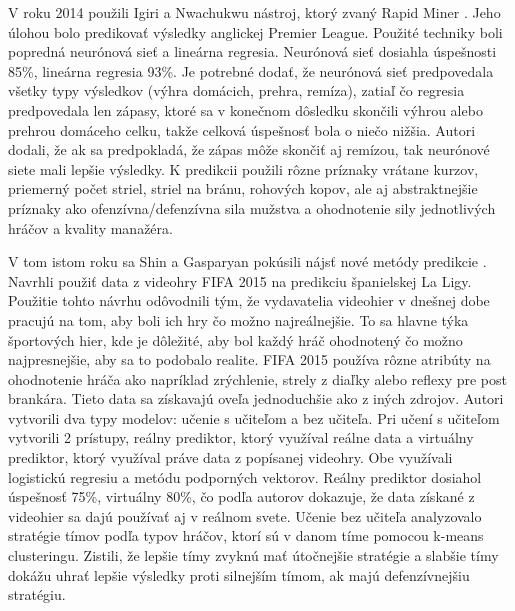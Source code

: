 V roku 2014 použili Igiri a Nwachukwu nástroj, ktorý zvaný Rapid Miner \citep{related:igiri}. 
Jeho úlohou bolo predikovať výsledky anglickej Premier League. 
Použité techniky boli popredná neurónová sieť a lineárna regresia. 
Neurónová sieť dosiahla úspešnosti 85\%, lineárna regresia 93\%. 
Je potrebné dodať, že neurónová sieť predpovedala všetky typy výsledkov (výhra domácich, prehra, remíza), zatiaľ čo regresia predpovedala len zápasy, ktoré sa v konečnom dôsledku skončili výhrou alebo prehrou domáceho celku, takže celková úspešnosť bola o niečo nižšia. 
Autori dodali, že ak sa predpokladá, že zápas môže skončiť aj remízou, tak neurónové siete mali lepšie výsledky. 
K predikcii použili rôzne príznaky vrátane kurzov, priemerný počet striel, striel na bránu, rohových kopov, ale aj abstraktnejšie príznaky ako ofenzívna/defenzívna sila mužstva a ohodnotenie sily jednotlivých hráčov a kvality manažéra.

V tom istom roku sa Shin a Gasparyan pokúsili nájsť nové metódy predikcie \citep{related:shin}. 
Navrhli použiť data z videohry FIFA 2015 na predikciu španielskej La Ligy.
Použitie tohto návrhu odôvodnili tým, že vydavatelia videohier v dnešnej dobe pracujú na tom, aby boli ich hry čo možno najreálnejšie.
To sa hlavne týka športových hier, kde je dôležité, aby bol každý hráč ohodnotený čo možno najpresnejšie, aby sa to podobalo realite.
FIFA 2015 používa rôzne atribúty na ohodnotenie hráča ako napríklad zrýchlenie, strely z diaľky alebo reflexy pre post brankára.
Tieto data sa získavajú oveľa jednoduchšie ako z iných zdrojov.
Autori vytvorili dva typy modelov: učenie s učiteľom a bez učiteľa.
Pri učení s učiteľom vytvorili 2 prístupy, reálny prediktor, ktorý využíval reálne data a virtuálny prediktor, ktorý využíval práve data z popísanej videohry.
Obe využívali logistickú regresiu a metódu podporných vektorov.
Reálny prediktor dosiahol úspešnosť 75\%, virtuálny 80\%, čo podľa autorov dokazuje, že data získané z videohier sa dajú používať aj v reálnom svete.
Učenie bez učiteľa analyzovalo stratégie tímov podľa typov hráčov, ktorí sú v danom tíme pomocou k-means clusteringu. Zistili, že lepšie tímy zvyknú mať útočnejšie stratégie a slabšie tímy dokážu uhrať lepšie výsledky proti silnejším tímom, ak majú defenzívnejšiu stratégiu.

